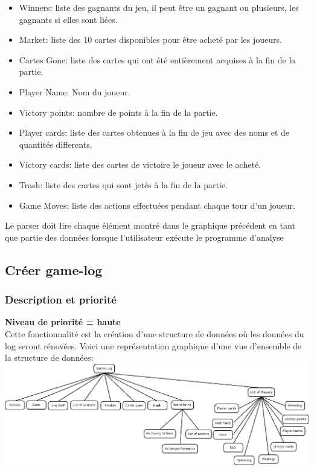 \documentclass{scrreprt}
\begin{document}
\begin{itemize}
\item Winners: liste des gagnants du jeu, il peut être un gagnant ou plusieurs, les gagnants si elles sont liées.
\item Market: liste des 10 cartes disponibles pour être acheté par les joueurs.
\item Cartes Gone: liste des cartes qui ont été entièrement acquises à la fin de la partie.
\item Player Name: Nom du joueur.
\item Victory points: nombre de points à la fin de la partie.
\item Player cards: liste des cartes obtenues à la fin de jeu avec des noms et de quantités differents.
\item Victory cards: liste des cartes de victoire le joueur avec le acheté.
\item Trash: liste des cartes qui sont jetés à la fin de la partie.
\item Game Moves: liste des actions effectuées pendant chaque tour d'un joueur.
\end{itemize}
Le parser doit lire chaque élément montré dans le graphique précédent en tant que partie des données lorsque l'utilisateur exécute le programme d'analyse\\

\subsection{Créer game-log}
\subsubsection{Description et priorité}
\textbf{Niveau de priorité = haute}\\
Cette fonctionnalité est la création d'une structure de données où les données du log seront rénovées.
Voici une représentation graphique d'une vue d'ensemble de la structure de données:\\
\includegraphics[scale=0.5,keepaspectratio]{game-log}
\end{document}
